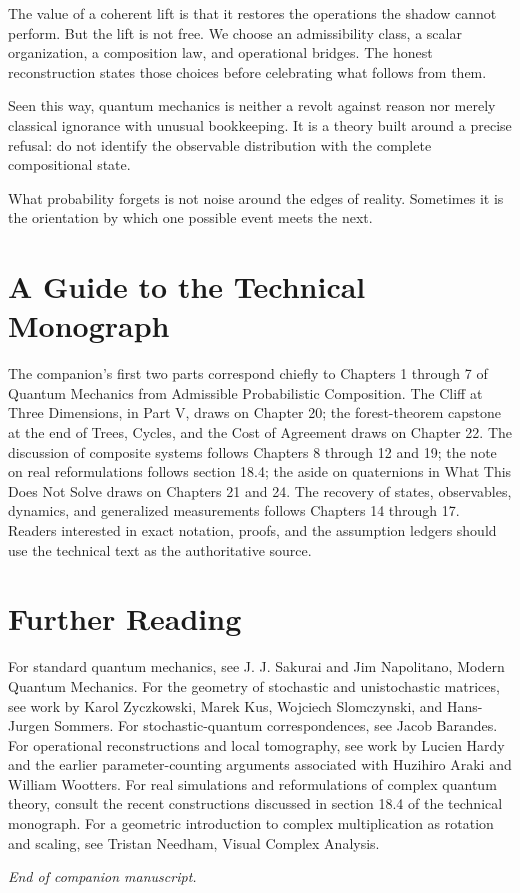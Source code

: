 \documentclass[12pt,openany]{book}
\begin{document}
The value of a coherent lift is that it restores the operations the shadow cannot perform. But the lift is not free. We choose an admissibility class, a scalar organization, a composition law, and operational bridges. The honest reconstruction states those choices before celebrating what follows from them.

Seen this way, quantum mechanics is neither a revolt against reason nor merely classical ignorance with unusual bookkeeping. It is a theory built around a precise refusal: do not identify the observable distribution with the complete compositional state.

What probability forgets is not noise around the edges of reality. Sometimes it is the orientation by which one possible event meets the next.

\backmatter
\chapter*{A Guide to the Technical Monograph}
The companion's first two parts correspond chiefly to Chapters 1 through 7 of Quantum Mechanics from Admissible Probabilistic Composition. The Cliff at Three Dimensions, in Part V, draws on Chapter 20; the forest-theorem capstone at the end of Trees, Cycles, and the Cost of Agreement draws on Chapter 22. The discussion of composite systems follows Chapters 8 through 12 and 19; the note on real reformulations follows section 18.4; the aside on quaternions in What This Does Not Solve draws on Chapters 21 and 24. The recovery of states, observables, dynamics, and generalized measurements follows Chapters 14 through 17. Readers interested in exact notation, proofs, and the assumption ledgers should use the technical text as the authoritative source.

\chapter*{Further Reading}
For standard quantum mechanics, see J. J. Sakurai and Jim Napolitano, Modern Quantum Mechanics. For the geometry of stochastic and unistochastic matrices, see work by Karol Zyczkowski, Marek Kus, Wojciech Slomczynski, and Hans-Jurgen Sommers. For stochastic-quantum correspondences, see Jacob Barandes. For operational reconstructions and local tomography, see work by Lucien Hardy and the earlier parameter-counting arguments associated with Huzihiro Araki and William Wootters. For real simulations and reformulations of complex quantum theory, consult the recent constructions discussed in section 18.4 of the technical monograph. For a geometric introduction to complex multiplication as rotation and scaling, see Tristan Needham, Visual Complex Analysis.

\vfill
\begin{center}
\small\textit{End of companion manuscript.}
\end{center}
\end{document}

